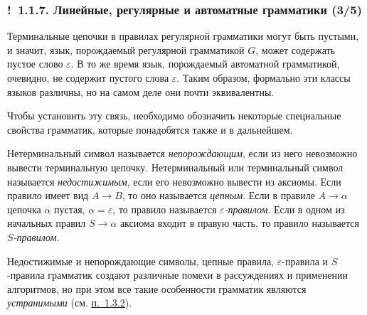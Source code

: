 \documentclass[mathserif,12pt,aspectratio=169]{beamer}
\def\emразделенной{\em разделенной}
\renewcommand{\index}[1]{}
\def\em#1{\it\color{blue}#1}
\def\odmkey#1#2{{\it\color{red} #1}\index{#2}}
\def\DMref#1#2{{\color{blue}\underline{\hyperlink{#2}{#1}}}}
\def\Ok{{\color{green}\textbf{!}\ }}
\begin{document}
\begin{frame}
\frametitle{\Ok 1.1.7. Линейные, регулярные и автоматные грамматики (3/5)}

Терминальные цепочки в правилах регулярной грамматики могут быть
пустыми, и значит, язык, порождаемый регулярной грамматикой $G$,
может содержать пустое слово $\varepsilon$.  В то же время язык,
порождаемый автоматной грамматикой, очевидно, не содержит пустого
слова $\varepsilon$. 
Таким образом, формально эти классы языков различны, но на самом деле они почти эквивалентны.

\smallskip
Чтобы установить эту связь,
необходимо обозначить некоторые специальные свойства
грамматик, которые понадобятся также и в дальнейшем.    

Нетерминальный символ называется
\odmkey{непорождающим}{Символ!непорождающий},
если из него невозможно вывести терминальную цепочку.
Нетерминальный или терминальный  символ называется
\odmkey{недостижимым}{Символ!недостижимый},
если его невозможно вывести из аксиомы.
Если правило имеет вид $A\rightarrow B$, то оно называется
\odmkey{цепным}{правило!цепное}. 
Если в правиле $A\rightarrow
\alpha$ цепочка $\alpha$ пустая,
$\alpha=\varepsilon$, то правило называется
\odmkey{$\varepsilon$-правилом}{Правило!$\varepsilon$}.
Если в одном из начальных правил $S\rightarrow \alpha$
аксиома входит в правую часть,
то правило называется 
\odmkey{$S$-правилом}{Правило!$S$}.

Недостижимые и непорождающие символы, цепные правила,
$\varepsilon$-правила и $S$-правила грамматик
создают различные помехи в рассуждениях и применении алгоритмов, но при этом все такие особенности грамматик являются {\em устранимыми} (см. \DMref{п.~1.3.2}{1.3.2.}).

\end{frame}
\end{document}
